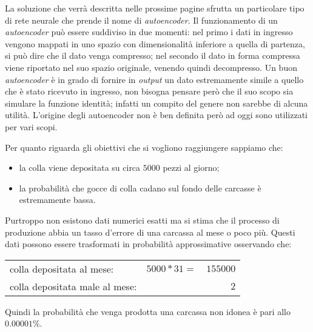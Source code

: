 %
%
%
%

La soluzione che verrà descritta nelle prossime pagine sfrutta un particolare tipo di rete neurale che prende il nome di \textit{autoencoder}.
Il funzionamento di un \textit{autoencoder} può essere suddiviso in due momenti:
nel primo i dati in ingresso vengono mappati in uno spazio con dimensionalità inferiore a quella di partenza, si può dire che il dato venga compresso;
nel secondo il dato in forma compressa viene riportato nel suo spazio originale, venendo quindi decompresso.
Un buon \textit{autoencoder} è in grado di fornire in \textit{output} un dato estremamente simile a quello che è stato ricevuto in ingresso, non bisogna pensare però che il suo scopo sia simulare la funzione identità; infatti un compito del genere non sarebbe di alcuna utilità.
L'origine degli autoencoder non è ben definita però ad oggi sono utilizzati per vari scopi.

Per quanto riguarda gli obiettivi che si vogliono raggiungere sappiamo che:
\begin{itemize}
  \item la colla viene depositata su circa $5000$ pezzi al giorno;
  \item la probabilità che gocce di colla cadano sul fondo delle carcasse è estremamente bassa.
\end{itemize}
Purtroppo non esistono dati numerici esatti ma si stima che il processo di produzione abbia un tasso d'errore di una carcassa al mese o poco più.
Questi dati possono essere trasformati in probabilità approssimative osservando che:
\begin{center}
  \begin{tabular}{ l c r }
    colla depositata al mese: & $5000 * 31 =$& $155000$ \\
    colla depositata male al mese: && $2$
  \end{tabular}
\end{center}
Quindi la probabilità che venga prodotta una carcassa non idonea è pari allo $0.00001\%$.

